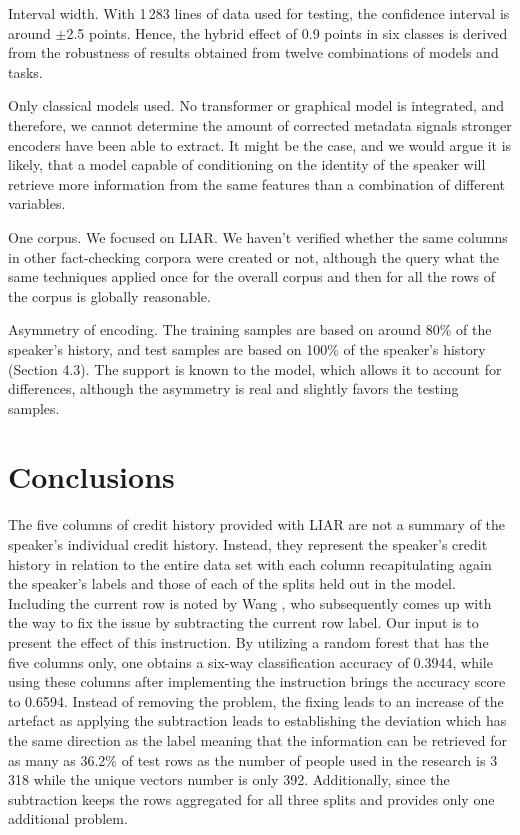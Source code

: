 Interval width. With 1\,283 lines of data used for testing, the confidence interval is around $\pm$2.5 points. Hence, the hybrid effect of 0.9 points in six classes is derived from the robustness of results obtained from twelve combinations of models and tasks.

Only classical models used. No transformer or graphical model is integrated, and therefore, we cannot determine the amount of corrected metadata signals stronger encoders have been able to extract. It might be the case, and we would argue it is likely, that a model capable of conditioning on the identity of the speaker will retrieve more information from the same features than a combination of different variables.

One corpus. We focused on LIAR. We haven't verified whether the same columns in other fact-checking corpora were created or not, although the query what the same techniques applied once for the overall corpus and then for all the rows of the corpus is globally reasonable.

Asymmetry of encoding. The training samples are based on around 80\% of the speaker's history, and test samples are based on 100\% of the speaker's history (Section 4.3). The support is known to the model, which allows it to account for differences, although the asymmetry is real and slightly favors the testing samples.

\section{Conclusions}

The five columns of credit history provided with LIAR are not a summary of the speaker's individual credit history. Instead, they represent the speaker's credit history in relation to the entire data set with each column recapitulating again the speaker's labels and those of each of the splits held out in the model. Including the current row is noted by Wang \cite{wang2017liar}, who subsequently comes up with the way to fix the issue by subtracting the current row label. Our input is to present the effect of this instruction. By utilizing a random forest that has the five columns only, one obtains a six-way classification accuracy of 0.3944, while using these columns after implementing the instruction brings the accuracy score to 0.6594. Instead of removing the problem, the fixing leads to an increase of the artefact as applying the subtraction leads to establishing the deviation which has the same direction as the label meaning that the information can be retrieved for as many as 36.2\% of test rows as the number of people used in the research is 3\,318 while the unique vectors number is only 392. Additionally, since the subtraction keeps the rows aggregated for all three splits and provides only one additional problem.

